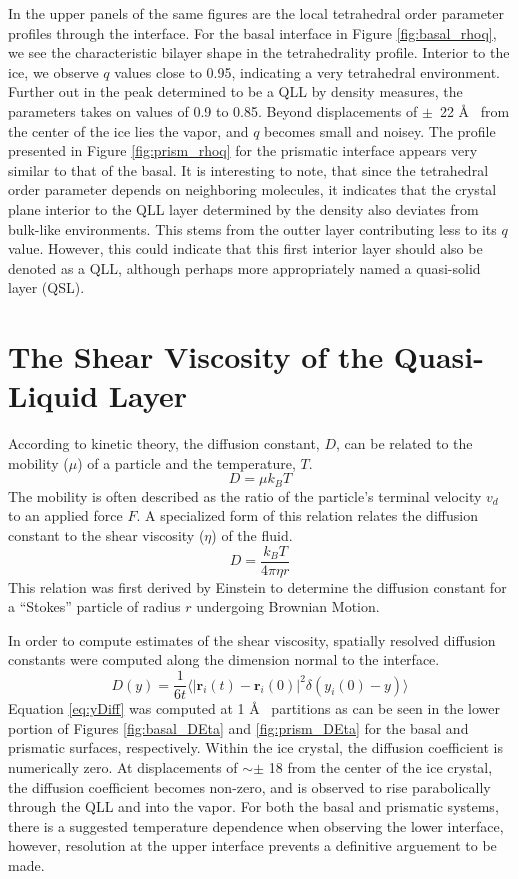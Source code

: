 In the upper panels of the same figures are the local tetrahedral
order parameter profiles through the interface. For the basal
interface in Figure \ref{fig:basal_rhoq}, we see the characteristic
bilayer shape in the tetrahedrality profile. Interior to the ice, we
observe $q$ values close to 0.95, indicating a very tetrahedral
environment. Further out in the peak determined to be a QLL by density
measures, the parameters takes on values of 0.9 to 0.85. Beyond
displacements of $\pm$~22 \AA~ from the center of the ice lies the
vapor, and $q$ becomes small and noisey. The profile presented in
Figure \ref{fig:prism_rhoq} for the prismatic interface appears very
similar to that of the basal. It is interesting to note, that since
the tetrahedral order parameter depends on neighboring molecules, it
indicates that the crystal plane interior to the QLL layer determined
by the density also deviates from bulk-like environments. This stems
from the outter layer contributing less to its $q$ value. However,
this could indicate that this first interior layer should also be
denoted as a QLL, although perhaps more appropriately named a
quasi-solid layer (QSL).



\section{The Shear Viscosity of the Quasi-Liquid Layer}
According to kinetic theory, the diffusion constant, $D$, can be
related to the mobility ($\mu$) of a particle and the temperature,
$T$.
\begin{equation}
D = \mu k_B T
\end{equation}
The mobility is often described as the ratio of the particle's
terminal velocity $v_d$ to an applied force $F$. A specialized form of
this relation relates the diffusion constant to the shear viscosity
($\eta$) of the fluid.
\begin{equation}\label{eq:stokes-einst}
D = \frac{k_BT}{4\pi \eta r}
\end{equation}
This relation was first derived by Einstein to determine the diffusion
constant for a ``Stokes'' particle of radius $r$ undergoing Brownian
Motion.

In order to compute estimates of the shear viscosity, spatially
resolved diffusion constants were computed along the dimension normal
to the interface.
\begin{equation}\label{eq:yDiff}
D(y) = \frac{1}{6t} \langle | \mathbf{r}_i(t) - \mathbf{r}_i(0) |^2
\delta(y_i(0) - y)  \rangle 
\end{equation}
Equation \eqref{eq:yDiff} was computed at 1 \AA~ partitions as can be
seen in the lower portion of Figures \ref{fig:basal_DEta} and
\ref{fig:prism_DEta} for the basal and prismatic surfaces,
respectively. Within the ice crystal, the diffusion coefficient is
numerically zero. At displacements of $\sim \pm$ 18 from the center of
the ice crystal, the diffusion coefficient becomes non-zero, and is
observed to rise parabolically through the QLL and into the
vapor. For both the basal and prismatic systems, there is a suggested
temperature dependence when observing the lower interface, however,
resolution at the upper interface prevents a definitive arguement to
be made. 

